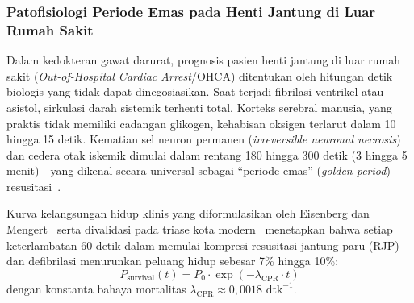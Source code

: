 \documentclass[journal,compsoc]{IEEEtran}
\begin{document}
\subsubsection{Patofisiologi Periode Emas pada Henti Jantung di Luar Rumah Sakit}
Dalam kedokteran gawat darurat, prognosis pasien henti jantung di luar rumah sakit (\textit{Out-of-Hospital Cardiac Arrest}/OHCA) ditentukan oleh hitungan detik biologis yang tidak dapat dinegosiasikan. Saat terjadi fibrilasi ventrikel atau asistol, sirkulasi darah sistemik terhenti total. Korteks serebral manusia, yang praktis tidak memiliki cadangan glikogen, kehabisan oksigen terlarut dalam 10 hingga 15 detik. Kematian sel neuron permanen (\textit{irreversible neuronal necrosis}) dan cedera otak iskemik dimulai dalam rentang 180 hingga 300 detik (3 hingga 5 menit)—yang dikenal secara universal sebagai ``periode emas'' (\textit{golden period}) resusitasi~\cite{eisenberg2001cardiac}.

Kurva kelangsungan hidup klinis yang diformulasikan oleh Eisenberg dan Mengert~\cite{eisenberg2001cardiac} serta divalidasi pada triase kota modern~\cite{zandbergen2022accuracy} menetapkan bahwa setiap keterlambatan 60 detik dalam memulai kompresi resusitasi jantung paru (RJP) dan defibrilasi menurunkan peluang hidup sebesar 7\% hingga 10\%:
\begin{equation}
P_{\text{survival}}(t) = P_0 \cdot \exp\left(-\lambda_{\text{CPR}} \cdot t\right)
\end{equation}
dengan konstanta bahaya mortalitas $\lambda_{\text{CPR}} \approx 0{,}0018 \text{ dtk}^{-1}$.
\end{document}
